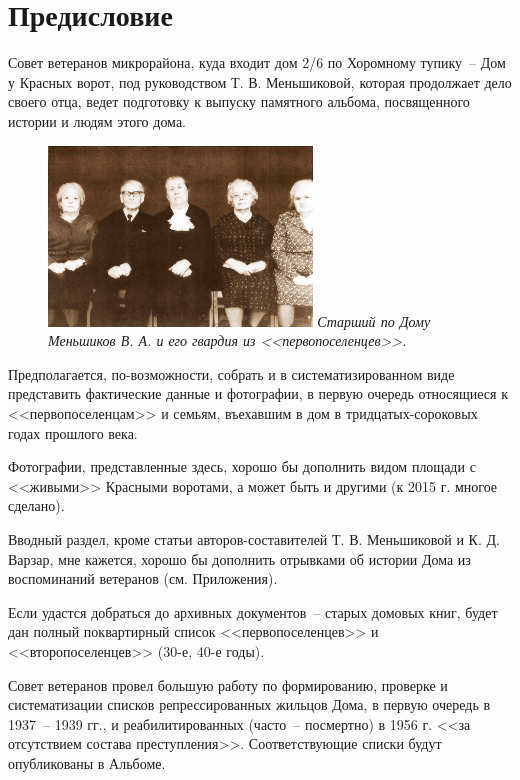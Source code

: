\chapter{Предисловие}

\noindent
Совет ветеранов микрорайона, куда входит дом 2/6 по Хоромному тупику~-- Дом у Красных ворот, под руководством Т. В. Меньшиковой, которая продолжает дело своего отца, ведет подготовку к выпуску памятного альбома, посвященного истории и людям этого дома.

\vspace{10pt}

\begin{figure}[ht]
  \centering
  \begin{minipage}{7cm}
  \includegraphics[width=7cm]{inc/3/1}
  \textit{\footnotesize{ Старший по Дому Меньшиков В. А. и его гвардия из <<первопоселенцев>>.}}
  \end{minipage}
\end{figure}

Предполагается, по-возможности, собрать и в систематизированном виде представить фактические данные и фотографии, в первую очередь относящиеся к <<первопоселенцам>> и семьям, въехавшим в дом в тридцатых-сороковых годах прошлого века.

Фотографии, представленные здесь, хорошо бы дополнить видом площади с <<живыми>> Красными воротами, а может быть и другими (к 2015 г. многое сделано).

Вводный раздел, кроме статьи авторов-составителей Т. В. Меньшиковой и К. Д. Варзар, мне кажется, хорошо бы дополнить отрывками об истории Дома из воспоминаний ветеранов (см. Приложения).

Если удастся добраться до архивных документов~-- старых домовых книг, будет дан полный поквартирный список <<первопоселенцев>> и <<второпоселенцев>> (30-е, 40-е годы).

Совет ветеранов провел большую работу по формированию, проверке и систематизации списков репрессированных жильцов Дома, в первую очередь в 1937~-- 1939 гг., и реабилитированных (часто~-- посмертно) в 1956 г. <<за отсутствием состава преступления>>. Соответствующие списки будут опубликованы в Альбоме.

